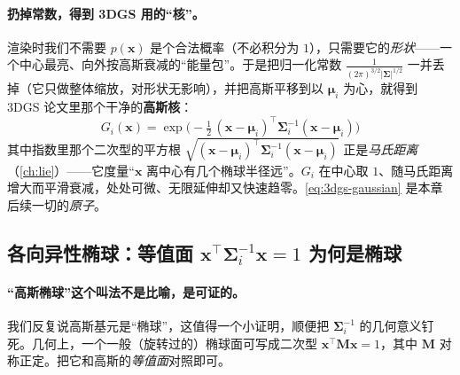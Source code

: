 \paragraph{扔掉常数，得到 3DGS 用的“核”。}
渲染时我们不需要 $p(\mathbf x)$ 是个合法概率（不必积分为 $1$），只需要它的\emph{形状}——一个中心最亮、向外按高斯衰减的“能量包”。于是把归一化常数 $\tfrac{1}{(2\pi)^{3/2}|\boldsymbol\Sigma|^{1/2}}$ 一并丢掉（它只做整体缩放，对形状无影响），并把高斯平移到以 $\boldsymbol\mu_i$ 为心，就得到 3DGS 论文里那个干净的\textbf{高斯核}：
\begin{equation}
  \boxed{\;G_i(\mathbf x)=\exp\!\Big(-\tfrac12\,(\mathbf x-\boldsymbol\mu_i)^\top\boldsymbol\Sigma_i^{-1}(\mathbf x-\boldsymbol\mu_i)\Big)\;}
  \label{eq:3dgs-gaussian}
\end{equation}
其中指数里那个二次型的平方根 $\sqrt{(\mathbf x-\boldsymbol\mu_i)^\top\boldsymbol\Sigma_i^{-1}(\mathbf x-\boldsymbol\mu_i)}$ 正是\emph{马氏距离}（\cref{ch:lie}）——它度量“$\mathbf x$ 离中心有几个椭球半径远”。$G_i$ 在中心取 $1$、随马氏距离增大而平滑衰减，处处可微、无限延伸却又快速趋零。\cref{eq:3dgs-gaussian} 是本章后续一切的\emph{原子}。

\subsection{各向异性椭球：等值面 \texorpdfstring{$\mathbf x^\top\boldsymbol\Sigma_i^{-1}\mathbf x=1$}{x^T _i^-1 x=1} 为何是椭球}

\paragraph{“高斯椭球”这个叫法不是比喻，是可证的。}
我们反复说高斯基元是“椭球”，这值得一个小证明，顺便把 $\boldsymbol\Sigma_i^{-1}$ 的几何意义钉死。几何上，一个一般（旋转过的）椭球面可写成二次型 $\mathbf x^\top\mathbf M\mathbf x=1$，其中 $\mathbf M$ 对称正定。把它和高斯的\emph{等值面}对照即可。


